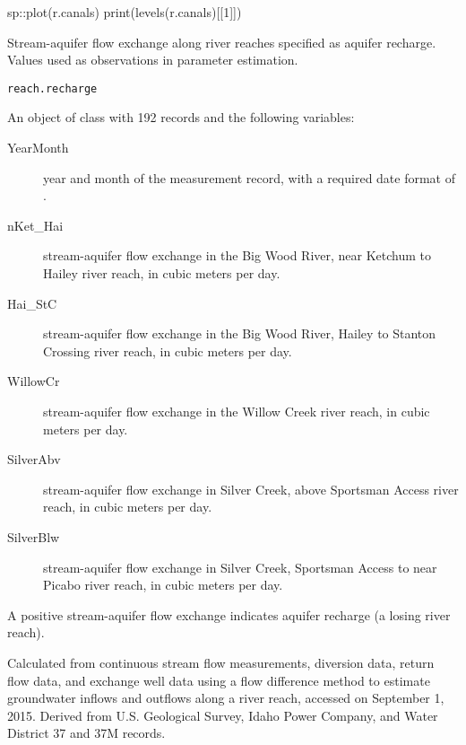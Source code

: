 \documentclass[a4paper]{book}
\begin{document}
%
\begin{Examples}
\begin{ExampleCode}
sp::plot(r.canals)
print(levels(r.canals)[[1]])

\end{ExampleCode}
\end{Examples}
%
\begin{Description}\relax
Stream-aquifer flow exchange along river reaches specified as aquifer recharge.
Values used as observations in parameter estimation.
\end{Description}
%
\begin{Usage}
\begin{verbatim}
reach.recharge
\end{verbatim}
\end{Usage}
%
\begin{Format}
An object of  class with 192 records and the following variables:
\begin{description}

\item[YearMonth] year and month of the measurement record,
with a required date format of .
\item[nKet\_Hai] stream-aquifer flow exchange in the Big Wood River,
near Ketchum to Hailey river reach, in cubic meters per day.
\item[Hai\_StC] stream-aquifer flow exchange in the Big Wood River,
Hailey to Stanton Crossing river reach, in cubic meters per day.
\item[WillowCr] stream-aquifer flow exchange in the Willow Creek river reach,
in cubic meters per day.
\item[SilverAbv] stream-aquifer flow exchange in Silver Creek,
above Sportsman Access river reach, in cubic meters per day.
\item[SilverBlw] stream-aquifer flow exchange in Silver Creek,
Sportsman Access to near Picabo river reach, in cubic meters per day.

\end{description}

\end{Format}
%
\begin{Details}\relax
A positive stream-aquifer flow exchange indicates aquifer recharge
(a losing river reach).
\end{Details}
%
\begin{Source}\relax
Calculated from continuous stream flow measurements, diversion data,
return flow data, and exchange well data using a flow difference method to
estimate groundwater inflows and outflows along a river reach,
accessed on September 1, 2015.
Derived from U.S. Geological Survey, Idaho Power Company,
and Water District 37 and 37M records.
\end{Source}
\end{document}
